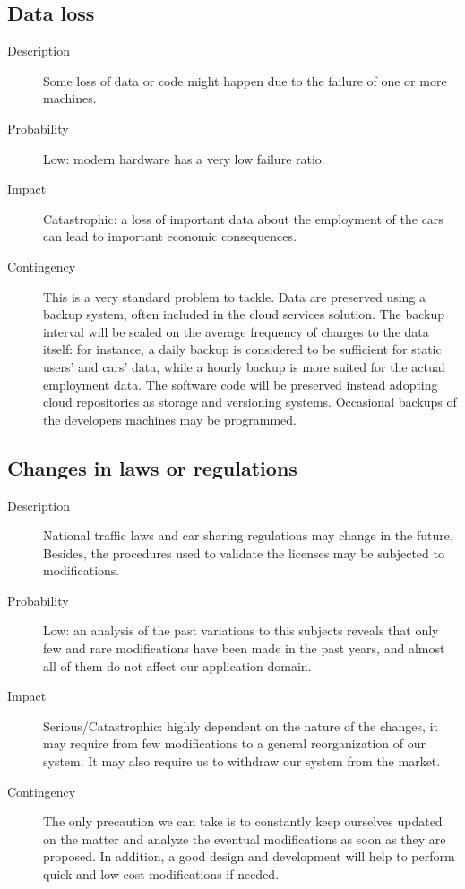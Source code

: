 \subsection*{Data loss}
	\begin{description}
		\item[Description] Some loss of data or code might happen due to the failure of one or more machines.
		\item[Probability] Low: modern hardware has a very low failure ratio.
		\item[Impact] Catastrophic: a loss of important data about the employment of the cars can lead to important economic consequences.
		\item[Contingency] This is a very standard problem to tackle. Data are preserved using a backup system, often included in the cloud services solution. The backup interval will be scaled on the average frequency of changes to the data itself: for instance, a daily backup is considered to be sufficient for static users' and cars' data, while a hourly backup is more suited for the actual employment data.\newline
		The software code will be preserved instead adopting cloud repositories as storage and versioning systems. Occasional backups of the developers machines may be programmed.
	\end{description}

\subsection*{Changes in laws or regulations}
	\begin{description}
		\item[Description] National traffic laws and car sharing regulations may change in the future. Besides, the procedures used to validate the licenses may be subjected to modifications.
		\item[Probability] Low: an analysis of the past variations to this subjects reveals that only few and rare modifications have been made in the past years, and almost all of them do not affect our application domain.
		\item[Impact] Serious/Catastrophic: highly dependent on the nature of the changes, it may require from few modifications to a general reorganization of our system. It may also require us to withdraw our system from the market.
		\item[Contingency] The only precaution we can take is to constantly keep ourselves updated on the matter and analyze the eventual modifications as soon as they are proposed. In addition, a good design and development will help to perform quick and low-cost modifications if needed.
	\end{description}

